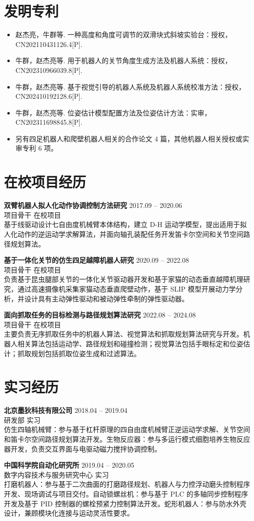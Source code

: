\documentclass[11pt,a4paper]{article}
\newcommand{\entry}[4]{%
  \textbf{#1} \hfill #2\\
  {\color{textgray}#3} \hfill {#4}\\[-2pt]
}
\begin{document}
\section*{发明专利}
\begin{itemize}
	\item 赵杰亮，牛群等. 一种高度和角度可调节的双滑块式斜坡实验台：授权，CN202110431126.4[P].
	\item 牛群，赵杰亮等. 用于机器人的关节角度生成方法及机器人系统：授权，CN202310966039.8[P].
	\item 牛群，赵杰亮等. 基于视觉引导的机器人系统及机器人系统校准方法：授权，CN202410192128.6[P].
	\item 牛群，赵杰亮等. 位姿估计模型配置方法及位姿估计方法：实审，CN202311698845.8[P].
	\item 另有四足机器人和爬壁机器人相关的合作论文 4 篇，其他机器人相关授权或实审专利 6 项。
\end{itemize}

\section*{在校项目经历}
\entry{双臂机器人拟人化动作协调控制方法研究}{2017.09 -- 2020.06}{项目骨干}{在校项目}
基于线驱动设计七自由度机械臂本体结构，建立 D-H 运动学模型，提出适用于拟人化动作的逆运动学求解算法，并面向轴孔装配任务开发笛卡尔空间和关节空间路径规划算法。

\entry{基于一体化关节的仿生四足越障机器人研究}{2020.09 -- 2022.08}{项目骨干}{在校项目}
负责基于昆虫腿部关节的一体化关节驱动器开发和基于家猫的动态垂直越障机理研究，通过高速摄像机采集家猫动态垂直爬壁动作，基于 SLIP 模型开展动力学分析，并设计具有主动弹性驱动和被动弹性牵制的弹性驱动器。

\entry{面向抓取任务的目标检测与路径规划算法研究}{2022.08 -- 2024.08}{项目骨干}{在校项目}
主要负责无序抓取任务中的机器人算法、视觉算法和抓取规划算法研究与开发。机器人相关算法包括运动学、路径规划和碰撞检测；视觉算法包括手眼标定和位姿估计；抓取规划包括抓取位姿生成和过滤算法。

\section*{实习经历}
\entry{北京墨狄科技有限公司}{2018.04 -- 2019.04}{研发部}{实习}
仿生四轴机械臂：参与基于杠杆原理的四自由度机械臂正逆运动学求解、关节空间和笛卡尔空间路径规划算法开发。生物反应器：参与多运行模式细胞培养生物反应器开发，负责交互界面与电驱动磁力搅拌协调控制。

\entry{中国科学院自动化研究所}{2019.04 -- 2020.05}{数字内容技术与服务研究中心}{实习}
打磨机器人：参与基于二次曲面的打磨路径规划、机器人与力控浮动磨头控制程序开发、现场调试与项目交付。自动锁螺丝机：参与基于 PLC 的多轴同步控制程序开发及基于 PID 控制器的螺栓预紧力控制算法开发。蛇形机器人：参与防水外壳设计，兼顾模块化连接与运动灵活性要求。
\end{document}
